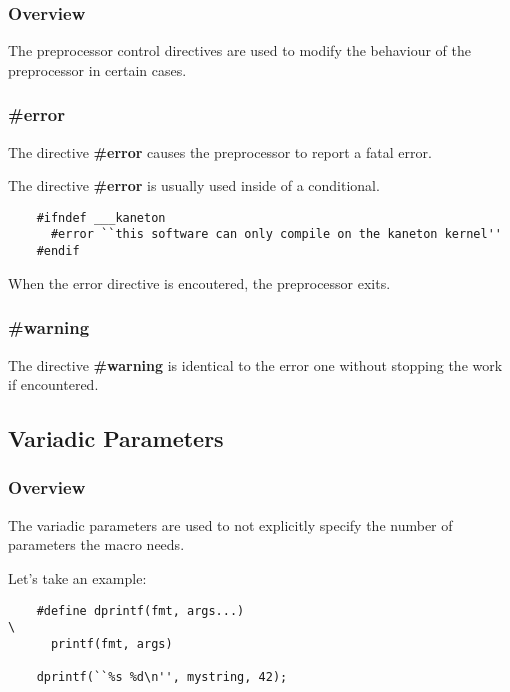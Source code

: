 
\begin{frame}
  \frametitle{Overview}

  The preprocessor control directives are used to modify the behaviour
  of the preprocessor in certain cases.
\end{frame}


\begin{frame}[containsverbatim]
  \frametitle{\textbf{\#error}}

  The directive \textbf{\#error} causes the preprocessor to report a
  fatal error.

  \nl

  The directive \textbf{\#error} is usually used inside of a conditional.

  \begin{verbatim}
    #ifndef ___kaneton
      #error ``this software can only compile on the kaneton kernel''
    #endif
  \end{verbatim}

  When the error directive is encoutered, the preprocessor exits.
\end{frame}


\begin{frame}
  \frametitle{\textbf{\#warning}}

    The directive \textbf{\#warning} is identical to the error one
    without stopping the work if encountered.
\end{frame}

%
%

\subsection{Variadic Parameters}


\begin{frame}[containsverbatim]
  \frametitle{Overview}

  The variadic parameters are used to not explicitly specify the number
  of parameters the macro needs.

  \nl

  Let's take an example:

  \begin{verbatim}
    #define dprintf(fmt, args...)                                       \
      printf(fmt, args)

    dprintf(``%s %d\n'', mystring, 42);
  \end{verbatim}
\end{frame}

